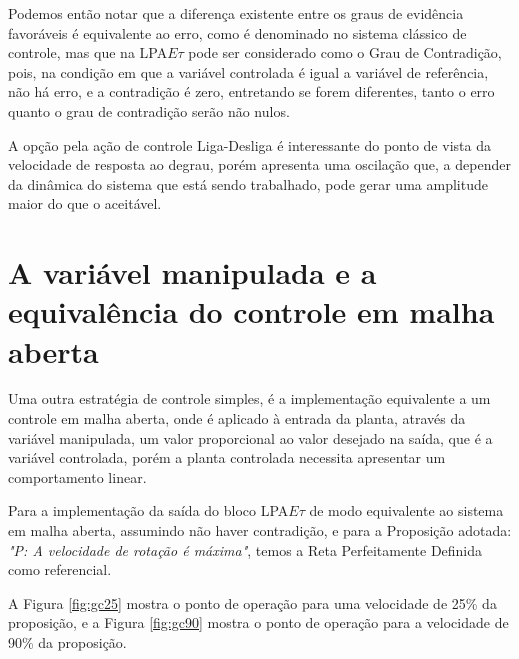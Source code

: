 




Podemos então notar que 
a diferença existente entre os graus de evidência favoráveis 
é equivalente ao erro, 
como é denominado no sistema clássico de controle, 
mas que na LPA$E\tau$ pode ser considerado como 
o Grau de Contradição, pois,
na condição em que a variável controlada é igual a 
variável de referência, não há erro, e a contradição é zero, 
entretando se forem diferentes, 
tanto o erro quanto o grau de contradição
serão não nulos. 

A opção pela ação de controle Liga-Desliga
é interessante do ponto de vista da velocidade 
de resposta ao degrau, 
porém apresenta uma oscilação que, 
a depender da dinâmica do sistema que está sendo trabalhado,
pode gerar uma amplitude maior do que o aceitável.



\section{A variável manipulada e a equivalência do controle em malha aberta}

Uma outra estratégia de controle simples, 
é a implementação equivalente a um controle em malha aberta,
onde é aplicado à entrada da planta, 
através da variável manipulada,
um valor proporcional ao valor desejado na saída,
que é a variável controlada, 
porém a planta controlada necessita apresentar um 
comportamento linear. 

Para a implementação da saída do bloco 
LPA$E\tau$ de modo equivalente ao sistema em malha aberta,
assumindo não haver contradição, 
e para a Proposição adotada: 
\emph{"P: A velocidade de rotação é máxima"}, 
temos a Reta Perfeitamente Definida como referencial. 

A Figura \ref{fig:gc25} mostra o ponto de operação 
para uma velocidade de 25\% da proposição, 
e a Figura \ref{fig:gc90} mostra o ponto de operação
para a velocidade de 90\% da proposição.









